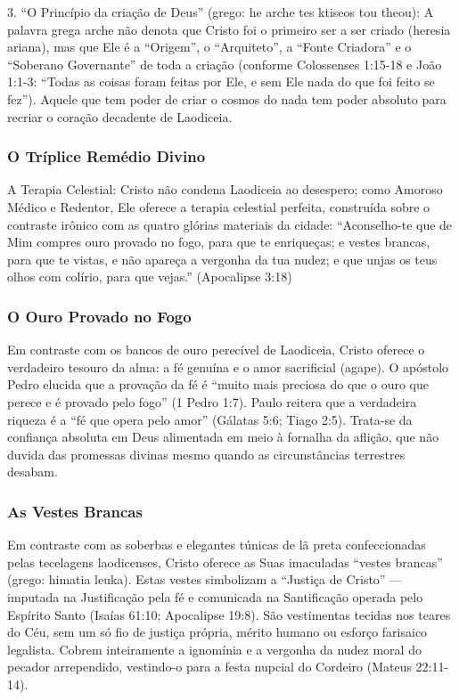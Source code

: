 3. ``O Princípio da criação de Deus'' (grego: he arche tes ktiseos tou theou): A palavra grega arche não denota que Cristo foi o primeiro ser a ser criado (heresia ariana), mas que Ele é a ``Origem'', o ``Arquiteto'', a ``Fonte Criadora'' e o ``Soberano Governante'' de toda a criação (conforme Colossenses 1:15-18 e João 1:1-3: ``Todas as coisas foram feitas por Ele, e sem Ele nada do que foi feito se fez''). Aquele que tem poder de criar o cosmos do nada tem poder absoluto para recriar o coração decadente de Laodiceia.


\subsubsection*{O Tríplice Remédio Divino}
A Terapia Celestial:
Cristo não condena Laodiceia ao desespero; como Amoroso Médico e Redentor, Ele oferece a terapia celestial perfeita, construída sobre o contraste irônico com as quatro glórias materiais da cidade:
``Aconselho-te que de Mim compres ouro provado no fogo, para que te enriqueças; e vestes brancas, para que te vistas, e não apareça a vergonha da tua nudez; e que unjas os teus olhos com colírio, para que vejas.'' (Apocalipse 3:18)


\subsubsection*{O Ouro Provado no Fogo}
Em contraste com os bancos de ouro perecível de Laodiceia, Cristo oferece o verdadeiro tesouro da alma: a fé genuína e o amor sacrificial (agape). O apóstolo Pedro elucida que a provação da fé é ``muito mais preciosa do que o ouro que perece e é provado pelo fogo'' (1 Pedro 1:7). Paulo reitera que a verdadeira riqueza é a ``fé que opera pelo amor'' (Gálatas 5:6; Tiago 2:5). Trata-se da confiança absoluta em Deus alimentada em meio à fornalha da aflição, que não duvida das promessas divinas mesmo quando as circunstâncias terrestres desabam.


\subsubsection*{As Vestes Brancas}
Em contraste com as soberbas e elegantes túnicas de lã preta confeccionadas pelas tecelagens laodicenses, Cristo oferece as Suas imaculadas ``vestes brancas'' (grego: himatia leuka). Estas vestes simbolizam a ``Justiça de Cristo'' — imputada na Justificação pela fé e comunicada na Santificação operada pelo Espírito Santo (Isaías 61:10; Apocalipse 19:8). São vestimentas tecidas nos teares do Céu, sem um só fio de justiça própria, mérito humano ou esforço farisaico legalista. Cobrem inteiramente a ignomínia e a vergonha da nudez moral do pecador arrependido, vestindo-o para a festa nupcial do Cordeiro (Mateus 22:11-14).


